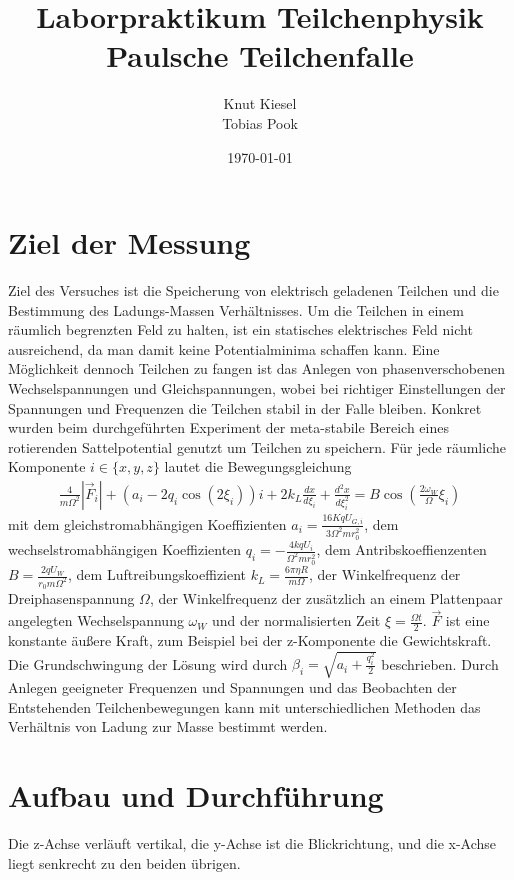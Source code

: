 \documentclass[a4paper,12pt]{article}
\title{Laborpraktikum Teilchenphysik\\ Paulsche Teilchenfalle}
\author{Knut Kiesel\\Tobias Pook}
\date{\today}
\begin{document}
\maketitle
\thispagestyle{empty}
\newpage
\tableofcontents
\setcounter{page}{1}
\newpage

\section{Ziel der Messung} %
Ziel des Versuches ist die Speicherung von elektrisch geladenen Teilchen und die Bestimmung des Ladungs-Massen Verhältnisses.
Um die Teilchen in einem räumlich begrenzten Feld zu halten, ist ein statisches elektrisches Feld nicht ausreichend, da man damit keine Potentialminima schaffen kann.
Eine Möglichkeit dennoch Teilchen zu fangen ist das Anlegen von phasenverschobenen Wechselspannungen und Gleichspannungen, wobei bei richtiger Einstellungen der Spannungen und Frequenzen die Teilchen stabil in der Falle bleiben.
Konkret wurden beim durchgeführten Experiment der meta-stabile Bereich eines rotierenden Sattelpotential genutzt um Teilchen zu speichern.
Für jede räumliche Komponente $i\in\{x,y,z\}$ lautet die Bewegungsgleichung
\begin{align*}\label{mastergleichung}
	\frac{4}{mΩ^2} |\vec{F}_i| + \left( a_i -2q_i \cos\left( 2\xi_i \right) \right) i  + 2k_L \frac{dx}{d\xi_i} + \frac{d^2x}{d\xi_i^2} = B\cos\left( \frac{2ω_W}{Ω}ξ_i \right)
\end{align*}
mit dem gleichstromabhängigen Koeffizienten $a_i = \frac{16KqU_{G,i}}{3Ω^2mr_0^2}$,
dem wechselstromabhängigen Koeffizienten  $q_i = -\frac{4kqU_i}{Ω^2mr_0^2}$,
dem Antribskoeffienzenten $B = \frac{2qU_W}{r_0mΩ^2}$,
dem Luftreibungskoeffizient $k_L = \frac{6πηR}{mΩ}$, der Winkelfrequenz der Dreiphasenspannung $Ω$,
der Winkelfrequenz der zusätzlich an einem Plattenpaar angelegten Wechselspannung $ω_W$
und der normalisierten Zeit $ξ = \frac{Ωt}{2}$.
$\vec{F}$ ist eine konstante äußere Kraft, zum Beispiel bei der z-Komponente die Gewichtskraft.
Die Grundschwingung der Lösung wird durch $β_i = \sqrt{a_i + \frac{q_i^2}{2}}$ beschrieben.
Durch Anlegen geeigneter Frequenzen und Spannungen und das Beobachten der Entstehenden Teilchenbewegungen kann mit unterschiedlichen Methoden das Verhältnis von Ladung zur Masse bestimmt werden.


\section{Aufbau und Durchführung}
Die z-Achse verläuft vertikal, die y-Achse ist die Blickrichtung, und die x-Achse liegt senkrecht zu den beiden übrigen.
\end{document}
